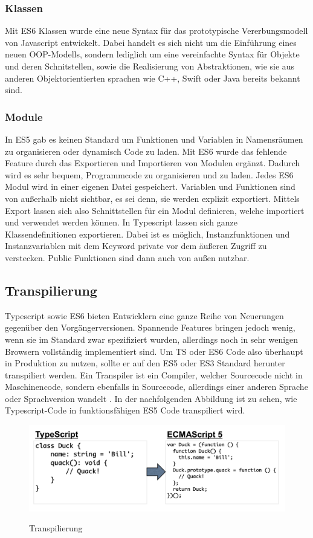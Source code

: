 \subsubsection{Klassen}

Mit ES6 Klassen wurde eine neue Syntax für das prototypische Vererbungsmodell von Javascript entwickelt.
Dabei handelt es sich nicht um die Einführung eines neuen OOP-Modells, sondern lediglich um eine vereinfachte Syntax für Objekte und deren Schnitstellen,
sowie die Realisierung von Abstraktionen, wie sie aus anderen Objektorientierten sprachen wie C++, Swift oder Java bereits bekannt sind.\cite{js-Klassen}



\subsubsection{Module}

In ES5 gab es keinen Standard um Funktionen und Variablen in Namensräumen zu organisieren oder dynamisch Code zu laden.
Mit ES6 wurde das fehlende Feature durch das Exportieren und Importieren von Modulen ergänzt. Dadurch wird es sehr bequem, Programmcode zu organisieren und zu laden.
Jedes ES6 Modul wird in einer eigenen Datei gespeichert. Variablen und Funktionen sind von außerhalb nicht sichtbar, es sei denn, sie werden explizit exportiert.
Mittels Export lassen sich also Schnittstellen für ein Modul definieren, welche importiert und verwendet werden können.
In Typescript lassen sich ganze Klassendefinitionen exportieren.
Dabei ist es möglich, Instanzfunktionen und Instanzvariablen mit dem Keyword private vor dem äußeren Zugriff zu verstecken.
Public Funktionen sind dann auch von außen nutzbar.



\subsection{Transpilierung}

Typescript sowie ES6 bieten Entwicklern eine ganze Reihe von Neuerungen gegenüber den Vorgängerversionen.
Spannende Features bringen jedoch wenig, wenn sie im Standard zwar spezifiziert wurden,
allerdings noch in sehr wenigen Browsern vollständig implementiert sind.
Um TS oder ES6 Code also überhaupt in Produktion zu nutzen, sollte er auf den ES5 oder ES3
Standard herunter transpiliert werden.
Ein Transpiler ist ein Compiler, welcher Sourcecode nicht in Maschinencode, sondern ebenfalls in Sourcecode,
allerdings einer anderen Sprache oder Sprachversion wandelt \cite{Introduction-to-the-Typescript-Transpiler}.
In der nachfolgenden Abbildung ist zu sehen, wie Typescript-Code in funktionsfähigen ES5 Code transpiliert wird.

\begin{figure}[ht]
 \centering
 \includegraphics[width=0.8\linewidth]{kapitel2/Introduction-transpiler.png}
 \caption{Transpilierung}\cite[27]{ng-Book-2}
\end{figure}
